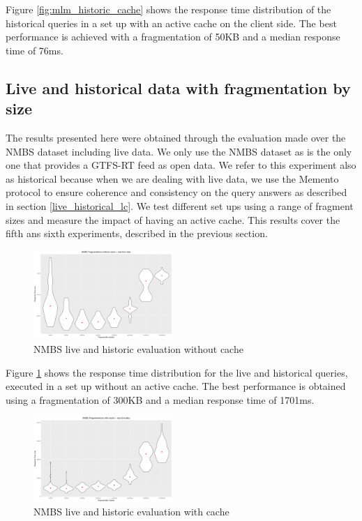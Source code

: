 \documentclass[sw]{iosart2x}
\begin{document}
	Figure \ref{fig:mlm_historic_cache} shows the response time distribution of the historical queries in a set up with an active cache on the client side. The best performance is achieved with a fragmentation of 50KB and a median response time of 76ms.
	
	\subsection{Live and historical data with fragmentation by size}
	The results presented here were obtained through the evaluation made over the NMBS dataset including live data. We only use the NMBS dataset as is the only one that provides a GTFS-RT feed as open data. We refer to this experiment also as historical because when we are dealing with live data, we use the Memento protocol to ensure coherence and consistency on the query answers as described in section \ref{live_historical_lc}. We test different set ups using a range of fragment sizes and measure the impact of having an active cache. This results cover the fifth ans sixth experiments, described in the previous section.
	
	\begin{figure}[h]
		\includegraphics[width=0.47\textwidth]{nmbs/live_no_cache.png}
		\caption{NMBS live and historic evaluation without cache}\label{fig:live_no_cache}
	\end{figure}
	
	Figure \ref{fig:live_no_cache} shows the response time distribution for the live and historical queries, executed in a set up without an active cache. The best performance is obtained using a fragmentation of 300KB and a median response time of 1701ms.
	
	\begin{figure}[h]
		\includegraphics[width=0.47\textwidth]{nmbs/live_cache.png}
		\caption{NMBS live and historic evaluation with cache}\label{fig:live_cache}
	\end{figure}
	
\end{document}
